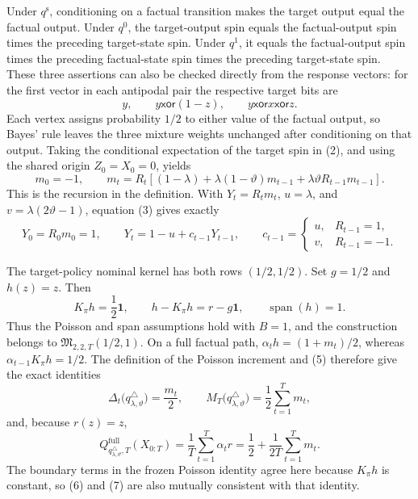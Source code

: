 Under \(q^{\mathrm s}\), conditioning on a factual transition makes the target output equal the factual output.  Under \(q^0\), the target-output spin equals the factual-output spin times the preceding target-state spin.  Under \(q^1\), it equals the factual-output spin times the preceding factual-state spin times the preceding target-state spin.  These three assertions can also be checked directly from the response vectors: for the first vector in each antipodal pair the respective target bits are
\[
 y,\qquad y\mathbin{\mathsf{xor}}(1-z),\qquad
 y\mathbin{\mathsf{xor}}x\mathbin{\mathsf{xor}}z.
 \tag{2}
\]
Each vertex assigns probability \(1/2\) to either value of the factual output, so Bayes' rule leaves the three mixture weights unchanged after conditioning on that output.  Taking the conditional expectation of the target spin in (2), and using the shared origin \(Z_0=X_0=0\), yields
\[
 m_0=-1,\qquad
 m_t=R_t\left[(1-\lambda)+\lambda(1-\vartheta)m_{t-1}
                 +\lambda\vartheta R_{t-1}m_{t-1}\right].
 \tag{3}
\]
This is the recursion in the definition.  With \(Y_t=R_tm_t\), \(u=\lambda\), and \(v=\lambda(2\vartheta-1)\), equation (3) gives exactly
\[
 Y_0=R_0m_0=1,\qquad
 Y_t=1-u+c_{t-1}Y_{t-1},\qquad
 c_{t-1}=\begin{cases}u,&R_{t-1}=1,\\v,&R_{t-1}=-1.\end{cases}
 \tag{4}
\]

The target-policy nominal kernel has both rows \((1/2,1/2)\).  Set \(g=1/2\) and \(h(z)=z\).  Then
\[
 K_{\pi}h=\frac12\mathbf 1,\qquad
 h-K_{\pi}h=r-g\mathbf 1,\qquad
 \operatorname{span}(h)=1.
 \tag{5}
\]
Thus the Poisson and span assumptions hold with \(B=1\), and the construction belongs to \(\mathfrak M_{2,2,T}(1/2,1)\).  On a full factual path, \(\alpha_t h=(1+m_t)/2\), whereas \(\alpha_{t-1}K_{\pi}h=1/2\).  The definition of the Poisson increment and (5) therefore give the exact identities
\[
 \Delta_t\bigl(q^{\triangle}_{\lambda,\vartheta}\bigr)=\frac{m_t}{2},
 \qquad
 M_T\bigl(q^{\triangle}_{\lambda,\vartheta}\bigr)=\frac12\sum_{t=1}^Tm_t,
 \tag{6}
\]
and, because \(r(z)=z\),
\[
 Q^{\mathrm{full}}_{q^{\triangle}_{\lambda,\vartheta},T}(X_{0:T})
 =\frac1T\sum_{t=1}^T\alpha_t r
 =\frac12+\frac1{2T}\sum_{t=1}^Tm_t.
 \tag{7}
\]
The boundary terms in the frozen Poisson identity agree here because \(K_{\pi}h\) is constant, so (6) and (7) are also mutually consistent with that identity.

